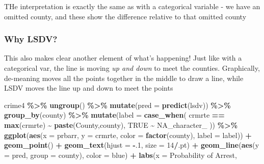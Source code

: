 \documentclass[
]{article}
\newenvironment{Shaded}{\begin{snugshade}}{\end{snugshade}}
\newcommand{\AttributeTok}[1]{\textcolor[rgb]{0.13,0.29,0.53}{#1}}
\newcommand{\ConstantTok}[1]{\textcolor[rgb]{0.56,0.35,0.01}{#1}}
\newcommand{\DecValTok}[1]{\textcolor[rgb]{0.00,0.00,0.81}{#1}}
\newcommand{\FunctionTok}[1]{\textcolor[rgb]{0.13,0.29,0.53}{\textbf{#1}}}
\newcommand{\NormalTok}[1]{#1}
\newcommand{\SpecialCharTok}[1]{\textcolor[rgb]{0.81,0.36,0.00}{\textbf{#1}}}
\newcommand{\StringTok}[1]{\textcolor[rgb]{0.31,0.60,0.02}{#1}}
\begin{document}
THe interpretation is exactly the same as with a categorical variable -
we have an omitted county, and these show the difference relative to
that omitted county

\hypertarget{why-lsdv-1}{%
\subsubsection{Why LSDV?}\label{why-lsdv-1}}

This also makes clear another element of what's happening! Just like
with a categorical var, the line is moving \emph{up and down} to meet
the counties. Graphically, de-meaning moves all the points together in
the middle to draw a line, while LSDV moves the line up and down to meet
the points

\begin{Shaded}
\begin{Highlighting}[]
\NormalTok{crime4 }\SpecialCharTok{\%\textgreater{}\%}
  \FunctionTok{ungroup}\NormalTok{() }\SpecialCharTok{\%\textgreater{}\%}
  \FunctionTok{mutate}\NormalTok{(}\AttributeTok{pred =} \FunctionTok{predict}\NormalTok{(lsdv)) }\SpecialCharTok{\%\textgreater{}\%}
  \FunctionTok{group\_by}\NormalTok{(county) }\SpecialCharTok{\%\textgreater{}\%}
  \FunctionTok{mutate}\NormalTok{(}\AttributeTok{label =} \FunctionTok{case\_when}\NormalTok{(}
\NormalTok{    crmrte }\SpecialCharTok{==} \FunctionTok{max}\NormalTok{(crmrte) }\SpecialCharTok{\textasciitilde{}} \FunctionTok{paste}\NormalTok{(}\StringTok{\textquotesingle{}County\textquotesingle{}}\NormalTok{,county),}
    \ConstantTok{TRUE} \SpecialCharTok{\textasciitilde{}} \ConstantTok{NA\_character\_}
\NormalTok{  )) }\SpecialCharTok{\%\textgreater{}\%}
  \FunctionTok{ggplot}\NormalTok{(}\FunctionTok{aes}\NormalTok{(}\AttributeTok{x =}\NormalTok{  prbarr, }\AttributeTok{y =}\NormalTok{ crmrte, }\AttributeTok{color =} \FunctionTok{factor}\NormalTok{(county), }\AttributeTok{label =}\NormalTok{ label)) }\SpecialCharTok{+} 
  \FunctionTok{geom\_point}\NormalTok{() }\SpecialCharTok{+} 
  \FunctionTok{geom\_text}\NormalTok{(}\AttributeTok{hjust =} \SpecialCharTok{{-}}\NormalTok{.}\DecValTok{1}\NormalTok{, }\AttributeTok{size =} \DecValTok{14}\SpecialCharTok{/}\NormalTok{.pt) }\SpecialCharTok{+} 
  \FunctionTok{geom\_line}\NormalTok{(}\FunctionTok{aes}\NormalTok{(}\AttributeTok{y =}\NormalTok{ pred, }\AttributeTok{group =}\NormalTok{ county), }\AttributeTok{color =} \StringTok{\textquotesingle{}blue\textquotesingle{}}\NormalTok{) }\SpecialCharTok{+}
  \FunctionTok{labs}\NormalTok{(}\AttributeTok{x =} \StringTok{\textquotesingle{}Probability of Arrest\textquotesingle{}}\NormalTok{, }

\end{Highlighting}
\end{Shaded}
\end{document}
